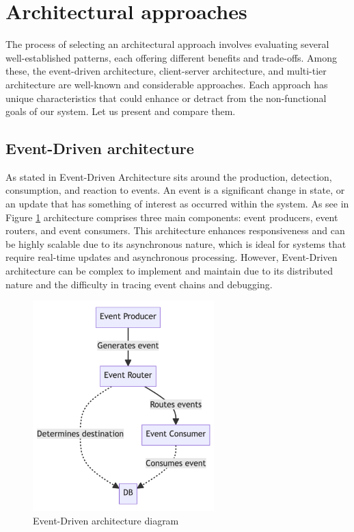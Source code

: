 

\section{Architectural approaches}
The process of selecting an architectural approach involves evaluating several well-established patterns, each offering different benefits and trade-offs. 
Among these, the event-driven architecture, client-server architecture, and multi-tier architecture are well-known and considerable approaches. 
Each approach has unique characteristics that could enhance or detract from the non-functional goals of our system.
Let us present and compare them.

\subsection{Event-Driven architecture}
As stated in \cite{edaDevto} Event-Driven Architecture sits around the production, detection, consumption, and reaction to events.
An event is a significant change in state, or an update that has something of interest as occurred within the system.
As see in Figure \ref{img03:event_drive_architecture_diagram} architecture comprises three main components: event producers, event routers, and event consumers.
This architecture enhances responsiveness and can be highly scalable due to its asynchronous nature, which is ideal for systems that require real-time updates and asynchronous processing.
However, Event-Driven architecture can be complex to implement and maintain due to its distributed nature and the difficulty in tracing event chains and debugging.
\begin{figure}[H]\centering
\includegraphics[width=70mm]{img/chap03/fig_event_driven_architecture_mermaid.png}
\caption{Event-Driven architecture diagram}
\label{img03:event_drive_architecture_diagram}
\end{figure}

